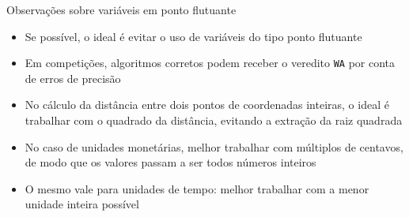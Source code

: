 \begin{frame}[fragile]{Observações sobre variáveis em ponto flutuante}

    \begin{itemize}
        \item Se possível, o ideal é evitar o uso de variáveis do tipo ponto flutuante

        \item Em competições, algoritmos corretos podem receber o veredito \texttt{WA} por
            conta de erros de precisão

        \item No cálculo da distância entre dois pontos de coordenadas inteiras, o ideal é 
        trabalhar com o quadrado da distância, evitando a extração da raiz quadrada

        \item No caso de unidades monetárias, melhor trabalhar com múltiplos de centavos, de modo
            que os valores passam a ser todos números inteiros

        \item O mesmo vale para unidades de tempo: melhor trabalhar com a menor unidade inteira
            possível
    \end{itemize}

\end{frame}
